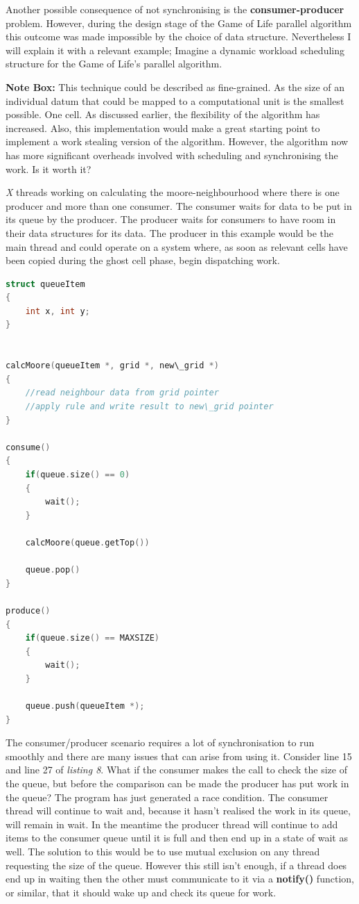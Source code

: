 \documentclass[11pt]{article} %
\begin{document}
Another possible consequence of not synchronising is the {\bf consumer-producer} problem. However, during the design stage of the Game of Life parallel algorithm this outcome was made impossible by the choice of data structure. Nevertheless I will explain it with a relevant example; Imagine a dynamic workload scheduling structure for the Game of Life's parallel algorithm.\cite[p10]{ref13}
\smallskip
\begin{mdframed}
{\bf Note Box: } This technique could be described as fine-grained. As the size of an individual datum that could be mapped to a computational unit is the smallest possible. One cell. As discussed earlier, the flexibility of the algorithm has increased. Also, this implementation would make a great starting point to implement a work stealing version of the algorithm. However, the algorithm now has more significant overheads involved with scheduling and synchronising the work. Is it worth it?
\end{mdframed}
\smallskip
{\it X} threads working on calculating the moore-neighbourhood where there is one producer and more than one consumer. The consumer waits for data to be put in its queue by the producer.  The producer waits for consumers to have room in their data structures for its data. The producer in this example would be the main thread and could operate on a system where, as soon as relevant cells have been copied during the ghost cell phase, begin dispatching work.
\begin{lstlisting}[language=C, caption={Dynamic Work allocation pseudo-code for the Game of Life}]
struct queueItem
{
    int x, int y;
}


calcMoore(queueItem *, grid *, new\_grid *)
{
    //read neighbour data from grid pointer
    //apply rule and write result to new\_grid pointer
}

consume()
{
    if(queue.size() == 0)
    {
        wait();
    }
    
    calcMoore(queue.getTop())
    
    queue.pop()
}

produce()
{
    if(queue.size() == MAXSIZE)
    {
        wait();
    }
    
    queue.push(queueItem *);
}
\end{lstlisting}
The consumer/producer scenario requires a lot of synchronisation to run smoothly and there are many issues that can arise from using it. Consider line 15 and line 27 of {\it listing 8}. What if the consumer makes the call to check the size of the queue, but before the comparison can be made the producer has put work in the queue? The program has just generated a race condition. The consumer thread will continue to wait and, because it hasn't realised the work in its queue, will remain in wait. In the meantime the producer thread will continue to add items to the consumer queue until it is full and then end up in a state of wait as well. The solution to this would be to use mutual exclusion on any thread requesting the size of the queue. However this still isn't enough, if a thread does end up in waiting then the other must communicate to it via a {\bf notify()} function, or similar, that it should wake up and check its queue for work.\cite[p18]{ref14}
\end{document}

